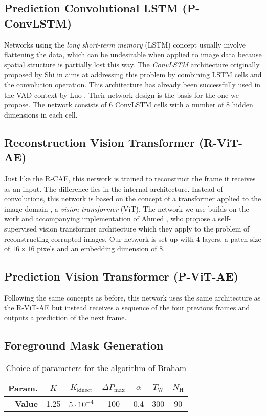 \documentclass[10pt,twocolumn,letterpaper]{article}
\begin{document}
\subsection{Prediction Convolutional LSTM (P-ConvLSTM)}
Networks using the \emph{long short-term memory} (LSTM) \cite{lstm} concept usually involve flattening the data, which can be undesirable when applied to image data because spatial structure is partially lost this way. The \emph{ConvLSTM} architecture originally proposed by Shi \etal in \cite{convlstm_orig_paper} aims at addressing this problem by combining LSTM cells and the convolution operation. This architecture has already been successfully used in the VAD context by Luo \etal \cite{conv_lstm_ad}. Their network design is the basis for the one we propose. The network consists of \num{6} ConvLSTM cells with a number of \num{8} hidden dimensions in each cell.

\subsection{Reconstruction Vision Transformer (R-ViT-AE)}
Just like the R-CAE, this network is trained to reconstruct the frame it receives as an input. The difference lies in the internal architecture. Instead of convolutions, this network is based on the concept of a transformer applied to the image domain \cite{vision_transformer}, \ie a \emph{vision transformer} (ViT). The network we use builds on the work and accompanying implementation of Ahmed \etal \cite{self-supervised_vision_transformer}, who propose a self-supervised vision transformer architecture which they apply to the problem of reconstructing corrupted images. Our network is set up with \num{4} layers, a patch size of $16{\times}16$ pixels and an embedding dimension of \num{8}.

\subsection{Prediction Vision Transformer (P-ViT-AE)}
Following the same concepts as before, this network uses the same architecture as the R-ViT-AE but instead receives a sequence of the four previous frames and outputs a prediction of the next frame.

\subsection{Foreground Mask Generation} \label{sec:fg_mask_gen}
\begin{table}[tb]
  \centering
  \begin{tabular}{r|c|c|c|c|c|c}
    \toprule
    \textbf{Param.} & $K$ & $K_\mathrm{kinect}$ & $\Delta P_\mathrm{max}$ & $\alpha$ & $T_\mathrm{W}$ & $N_\mathrm{H}$ \\
    \midrule
    \textbf{Value}     & \num{1.25} & $5 \cdot 10^{-4}$       & \num{100}         & \num{0.4}     & \num{300}  & \num{90} \\
    \bottomrule
  \end{tabular}
  \caption{Choice of parameters for the algorithm of Braham \etal \cite{physically_based_BGS}}
  \label{tab:bgs_parameters}
\end{table}
\end{document}
